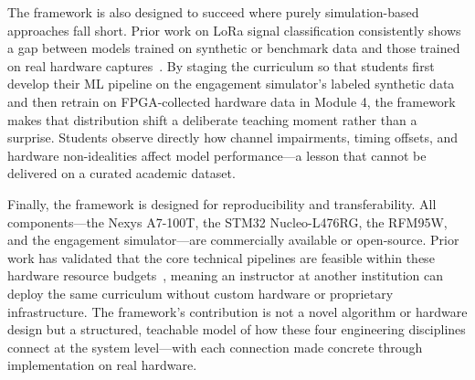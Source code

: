\documentclass[conference]{IEEEtran}
\begin{document}
The framework is also designed to succeed where purely simulation-based approaches fall short. Prior work on LoRa signal classification consistently shows a gap between models trained on synthetic or benchmark data and those trained on real hardware captures~\cite{b6,b8}. By staging the curriculum so that students first develop their ML pipeline on the engagement simulator's labeled synthetic data and then retrain on FPGA-collected hardware data in Module 4, the framework makes that distribution shift a deliberate teaching moment rather than a surprise. Students observe directly how channel impairments, timing offsets, and hardware non-idealities affect model performance---a lesson that cannot be delivered on a curated academic dataset.

Finally, the framework is designed for reproducibility and transferability. All components---the Nexys A7-100T, the STM32 Nucleo-L476RG, the RFM95W, and the engagement simulator---are commercially available or open-source. Prior work has validated that the core technical pipelines are feasible within these hardware resource budgets~\cite{b1,b3,b7}, meaning an instructor at another institution can deploy the same curriculum without custom hardware or proprietary infrastructure. The framework's contribution is not a novel algorithm or hardware design but a structured, teachable model of how these four engineering disciplines connect at the system level---with each connection made concrete through implementation on real hardware. %
\end{document}
